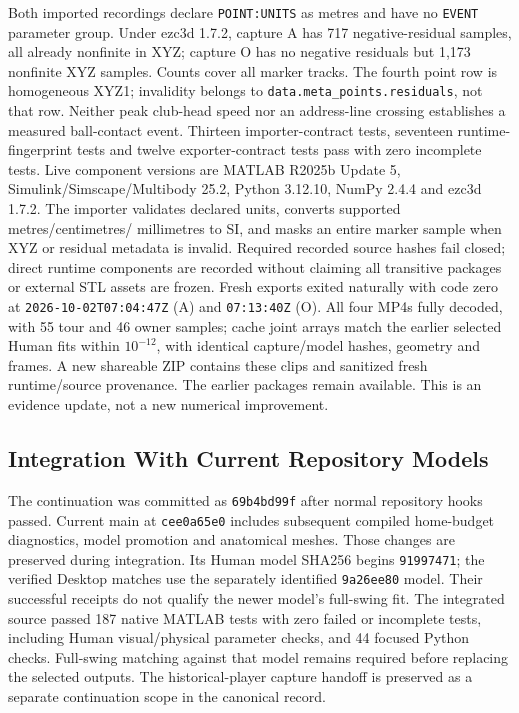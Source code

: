 \documentclass[11pt,a4paper]{article}
\begin{document}
Both imported recordings declare \texttt{POINT:UNITS} as metres and have no
\texttt{EVENT} parameter group. Under ezc3d 1.7.2, capture A has 717
negative-residual samples, all already nonfinite in XYZ; capture O has no
negative residuals but 1,173 nonfinite XYZ samples. Counts cover all marker
tracks. The fourth point row is homogeneous XYZ1; invalidity belongs to
\texttt{data.meta\_points.residuals}, not that row\cite{ezc3d}.
Neither peak club-head speed nor an address-line crossing establishes a
measured ball-contact event. Thirteen importer-contract tests, seventeen
runtime-fingerprint tests and twelve exporter-contract tests pass with zero
incomplete tests. Live component versions are MATLAB R2025b Update 5,
Simulink/Simscape/Multibody 25.2, Python 3.12.10, NumPy 2.4.4 and ezc3d 1.7.2.
The importer validates declared units, converts supported metres/centimetres/
millimetres to SI, and masks an entire marker sample when XYZ or residual
metadata is invalid. Required recorded source hashes fail closed; direct
runtime components are recorded without claiming all transitive packages or
external STL assets are frozen. Fresh exports exited naturally with code zero
at \texttt{2026-10-02T07:04:47Z} (A) and \texttt{07:13:40Z} (O).
All four MP4s fully decoded, with 55 tour and 46 owner samples; cache joint
arrays match the earlier selected Human fits within $10^{-12}$, with identical
capture/model hashes, geometry and frames. A new shareable ZIP contains these
clips and sanitized fresh runtime/source provenance. The earlier packages
remain available. This is an evidence update, not a new numerical improvement.

\subsection{Integration With Current Repository Models}
The continuation was committed as \texttt{69b4bd99f} after normal repository
hooks passed. Current main at \texttt{cee0a65e0} includes subsequent compiled
home-budget diagnostics, model promotion and anatomical meshes. Those changes
are preserved during integration. Its Human model SHA256 begins
\texttt{91997471}; the verified Desktop matches use the separately identified
\texttt{9a26ee80} model. Their successful receipts do not qualify the newer
model's full-swing fit. The integrated source passed 187 native MATLAB tests
with zero failed or incomplete tests, including Human visual/physical parameter
checks, and 44 focused Python checks. Full-swing matching against that model
remains required before replacing the selected outputs. The historical-player capture
handoff is preserved as a separate continuation scope in the canonical record.
\end{document}
